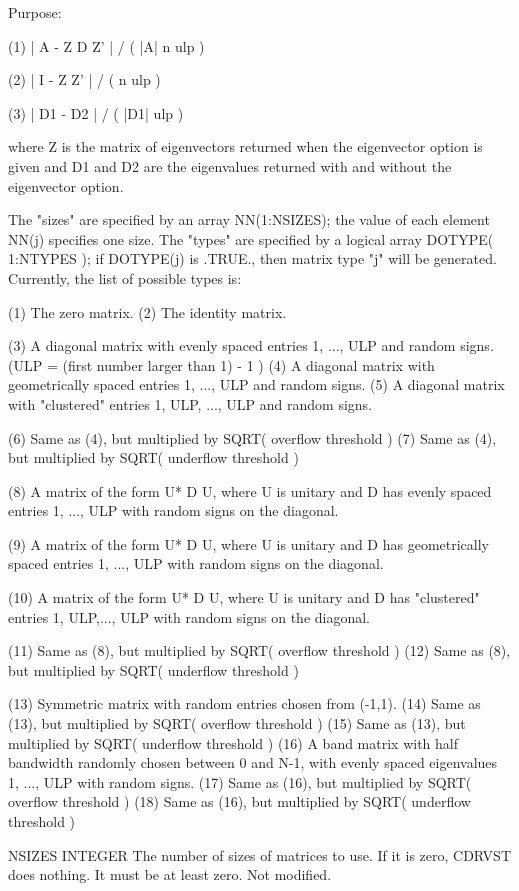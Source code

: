 \begin{DoxyParagraph}{Purpose\+: }
\begin{DoxyVerb}
      (1)     | A - Z D Z' | / ( |A| n ulp )

      (2)     | I - Z Z' | / ( n ulp )

      (3)     | D1 - D2 | / ( |D1| ulp )

      where Z is the matrix of eigenvectors returned when the
      eigenvector option is given and D1 and D2 are the eigenvalues
      returned with and without the eigenvector option.

      The "sizes" are specified by an array NN(1:NSIZES); the value of
      each element NN(j) specifies one size.
      The "types" are specified by a logical array DOTYPE( 1:NTYPES );
      if DOTYPE(j) is .TRUE., then matrix type "j" will be generated.
      Currently, the list of possible types is:

      (1)  The zero matrix.
      (2)  The identity matrix.

      (3)  A diagonal matrix with evenly spaced entries
           1, ..., ULP  and random signs.
           (ULP = (first number larger than 1) - 1 )
      (4)  A diagonal matrix with geometrically spaced entries
           1, ..., ULP  and random signs.
      (5)  A diagonal matrix with "clustered" entries 1, ULP, ..., ULP
           and random signs.

      (6)  Same as (4), but multiplied by SQRT( overflow threshold )
      (7)  Same as (4), but multiplied by SQRT( underflow threshold )

      (8)  A matrix of the form  U* D U, where U is unitary and
           D has evenly spaced entries 1, ..., ULP with random signs
           on the diagonal.

      (9)  A matrix of the form  U* D U, where U is unitary and
           D has geometrically spaced entries 1, ..., ULP with random
           signs on the diagonal.

      (10) A matrix of the form  U* D U, where U is unitary and
           D has "clustered" entries 1, ULP,..., ULP with random
           signs on the diagonal.

      (11) Same as (8), but multiplied by SQRT( overflow threshold )
      (12) Same as (8), but multiplied by SQRT( underflow threshold )

      (13) Symmetric matrix with random entries chosen from (-1,1).
      (14) Same as (13), but multiplied by SQRT( overflow threshold )
      (15) Same as (13), but multiplied by SQRT( underflow threshold )
      (16) A band matrix with half bandwidth randomly chosen between
           0 and N-1, with evenly spaced eigenvalues 1, ..., ULP
           with random signs.
      (17) Same as (16), but multiplied by SQRT( overflow threshold )
      (18) Same as (16), but multiplied by SQRT( underflow threshold )\end{DoxyVerb}
 \begin{DoxyVerb}  NSIZES  INTEGER
          The number of sizes of matrices to use.  If it is zero,
          CDRVST does nothing.  It must be at least zero.
          Not modified.


\end{DoxyVerb}
\end{DoxyParagraph}
